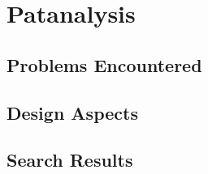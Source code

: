 
\chapter{Patanalysis}
\label{ch:analysis}

\startcontents[chapters]
\minicontents

\section{Problems Encountered}

\section{Design Aspects}

\section{Search Results}

\stopcontents[chapters]
